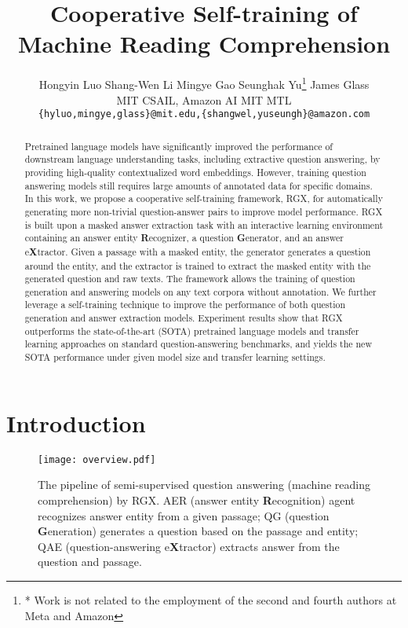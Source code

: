 \documentclass[11pt,a4paper]{article}
\title{Cooperative Self-training of Machine Reading Comprehension}
\author{Hongyin Luo  Shang-Wen Li  Mingye Gao  Seunghak Yu\thanks{ * Work is not related to the employment of the second and fourth authors at Meta and Amazon}  James Glass \\
  MIT CSAIL, Amazon AI  MIT MTL\\
  {\tt \{hyluo,mingye,glass\}@mit.edu,\{shangwel,yuseungh\}@amazon.com}\\
}
\date{}
\begin{document}
\maketitle

\begin{abstract}
Pretrained language models have significantly improved the performance of downstream language understanding tasks, including extractive question answering, by providing high-quality contextualized word embeddings. However, training question answering models still requires large amounts of annotated data for specific domains. In this work, we propose a cooperative self-training framework, RGX, for automatically generating more non-trivial question-answer pairs to improve model performance. RGX is built upon a masked answer extraction task with an interactive learning environment containing an answer entity \textbf{R}ecognizer, a question \textbf{G}enerator, and an answer e\textbf{X}tractor. Given a passage with a masked entity, the generator generates a question around the entity, and the extractor is trained to extract the masked entity with the generated question and raw texts. The framework allows the training of question generation and answering models on any text corpora without annotation.
We further leverage a self-training technique to improve the performance of both question generation and answer extraction models.
Experiment results show that RGX outperforms the state-of-the-art (SOTA) pretrained language models and transfer learning approaches on standard question-answering benchmarks, and yields the new SOTA performance under given model size and transfer learning settings.

\end{abstract}

\section{Introduction}
\label{sec:intro}
\begin{figure}[t]
\centering
\texttt{[image: overview.pdf]}
\caption{The pipeline of semi-supervised question answering (machine reading comprehension) by RGX. AER (answer entity \textbf{R}ecognition) agent recognizes answer entity from a given passage; QG (question \textbf{G}eneration) generates a question based on the passage and entity; QAE (question-answering e\textbf{X}tractor) extracts answer from the question and passage.}
\label{fig:example}
\end{figure}
\end{document}
